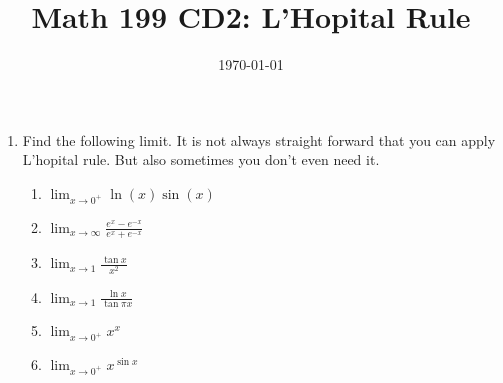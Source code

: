 \documentclass[12pt]{article}
\title{Math 199 CD2: L'Hopital Rule}
\date{\today}
\newcommand{\D}{\displaystyle}
\begin{document}
	
	\maketitle
	
	\begin{enumerate}
		\item Find the following limit. It is not always straight forward that you can apply L'hopital rule. But also sometimes you don't even need it. 
		\begin{enumerate}
			\item $\D \lim_{x \to 0^+}\ln (x)\sin(x)$
			\vskip 5cm
			\item $\D \lim_{x \to \infty }\frac{e^x-e^{-x}}{e^x+e^{-x}}$
			\vskip 5cm 
			\item $\D \lim_{x \to 1 }\frac{\tan x}{x^2}$
			\vskip 5cm
			\item $\D \lim_{x \to 1 }\frac{\ln x}{\tan \pi x}$
			\vskip 5cm
			\item $\lim_{x \to 0^+ }x^x$
			\vskip 5cm 
			\item $\lim_{x \to 0^+}x^{\sin x}$
		\end{enumerate}
	\end{enumerate}
	
\end{document}
